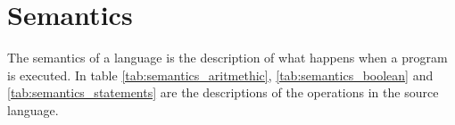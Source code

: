 



\newpage
\section{Semantics} \label{sec:semantics}
The semantics of a language is the description of what happens when a program is executed. In table \ref{tab:semantics_aritmethic}, \ref{tab:semantics_boolean} and \ref{tab:semantics_statements} are the descriptions of the operations in the source language. \\

